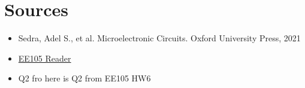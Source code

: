 \section{Sources}
\begin{itemize}
    \item Sedra, Adel S., et al. Microelectronic Circuits. Oxford University Press, 2021
    \item \href{https://file.notion.so/f/f/048d6522-202b-48d4-b5d9-bc005bd602e2/214bf1f0-292f-48d6-9016-737d9f5da155/ee105_reader_v3.pdf?id=237a4300-3dbe-47d1-888b-ffae90d8352b&table=block&spaceId=048d6522-202b-48d4-b5d9-bc005bd602e2&expirationTimestamp=1714435200000&signature=yx-H1qvZJIodPfazOpwXX0Ce2mWMG8skOHl45xoPxus&downloadName=ee105_reader_v3.pdf}{EE105 Reader}
    \item Q2 fro here is Q2 from EE105 HW6
\end{itemize}